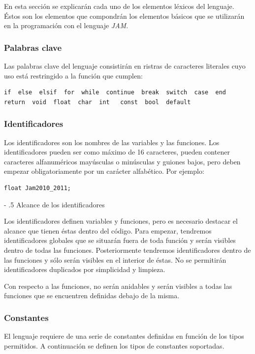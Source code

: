 \documentclass[a4paper,10pt]{article}
\makeatletter
\renewcommand\paragraph{%
   \@startsection{paragraph}{4}{0mm}%
      {-\baselineskip}%
      {.5\baselineskip}%
      {\normalfont\normalsize\bfseries}}
\makeatother
\begin{document}
En esta sección se explicarán cada uno de los elementos léxicos del lenguaje. Éstos son los elementos que compondrán los elementos básicos que se utilizarán en la programación con el lenguaje \textit{JAM}.

\subsubsection*{Palabras clave}

Las palabras clave del lenguaje consistirán en ristras de caracteres literales cuyo uso está restringido a la función que cumplen:
\begin{lstlisting}[language=jam]
if  else  elsif  for  while  continue  break  switch  case  end  return  void  float  char  int   const  bool  default
\end{lstlisting}

\subsubsection*{Identificadores}

Los identificadores son los nombres de las variables y las funciones. Los identificadores pueden ser como máximo de 16 caracteres, pueden contener caracteres alfanuméricos mayúsculas o minúsculas y guiones bajos, pero deben empezar obligatoriamente por un carácter alfabético. Por ejemplo:

\begin{lstlisting}[language=jam]
	float Jam2010_2011;
\end{lstlisting}

\paragraph{Alcance de los identificadores}

Los identificadores definen variables y funciones, pero es necesario destacar el alcance que tienen éstas dentro del código. Para empezar, tendremos identificadores globales que se situarán fuera de toda función y serán visibles dentro de todas las funciones. Posteriormente tendremos identificadores dentro de las funciones y sólo serán visibles en el interior de éstas. No se permitirán identificadores duplicados por simplicidad y limpieza.

Con respecto a las funciones, no serán anidables y serán visibles a todas las funciones que se encuentren definidas debajo de la misma.
\subsubsection*{Constantes}
El lenguaje requiere de una serie de constantes definidas en función de los tipos permitidos. A continuación se definen los tipos de constantes soportadas.
\end{document}
